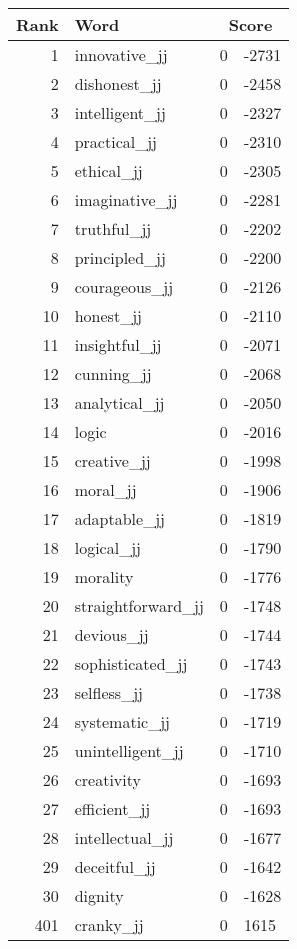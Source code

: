 \begin{longtable}[!htbp]{| rlr@{.}l |}
    \hline
    \textbf{Rank} & \textbf{Word} & \multicolumn{2}{c|}{\textbf{Score}} \\
    \hline
    \endhead
    1 & innovative\_jj & 0 & -2731 \\
    2 & dishonest\_jj & 0 & -2458 \\
    3 & intelligent\_jj & 0 & -2327 \\
    4 & practical\_jj & 0 & -2310 \\
    5 & ethical\_jj & 0 & -2305 \\
    6 & imaginative\_jj & 0 & -2281 \\
    7 & truthful\_jj & 0 & -2202 \\
    8 & principled\_jj & 0 & -2200 \\
    9 & courageous\_jj & 0 & -2126 \\
    10 & honest\_jj & 0 & -2110 \\
    11 & insightful\_jj & 0 & -2071 \\
    12 & cunning\_jj & 0 & -2068 \\
    13 & analytical\_jj & 0 & -2050 \\
    14 & logic & 0 & -2016 \\
    15 & creative\_jj & 0 & -1998 \\
    16 & moral\_jj & 0 & -1906 \\
    17 & adaptable\_jj & 0 & -1819 \\
    18 & logical\_jj & 0 & -1790 \\
    19 & morality & 0 & -1776 \\
    20 & straightforward\_jj & 0 & -1748 \\
    21 & devious\_jj & 0 & -1744 \\
    22 & sophisticated\_jj & 0 & -1743 \\
    23 & selfless\_jj & 0 & -1738 \\
    24 & systematic\_jj & 0 & -1719 \\
    25 & unintelligent\_jj & 0 & -1710 \\
    26 & creativity & 0 & -1693 \\
    27 & efficient\_jj & 0 & -1693 \\
    28 & intellectual\_jj & 0 & -1677 \\
    29 & deceitful\_jj & 0 & -1642 \\
    30 & dignity & 0 & -1628 \\
    401 & cranky\_jj & 0 & 1615 \\

\end{longtable}
